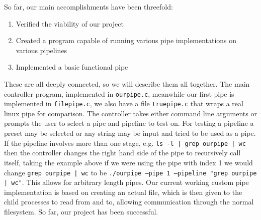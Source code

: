 So far, our main accomplishments have been threefold:
\begin{enumerate}
\item Verified the viability of our project
\item Created a program capable of running various pipe implementations on various pipelines
\item Implemented a basic functional pipe
\end{enumerate}
These are all deeply connected, so we will describe them all together. The main controller program, implemented in \texttt{ourpipe.c}, meanwhile our first pipe is implemented in \texttt{filepipe.c}, we also have a file \texttt{truepipe.c} that wraps a real linux pipe for comparison. The controller takes either command line arguments or prompts the user to select a pipe and pipeline to test on. For testing a pipeline a preset may be selected or any string may be input and tried to be used as a pipe. If the pipeline involves more than one stage, e.g. \texttt{ls -l | grep ourpipe | wc} then the controller changes the right hand side of the pipe to recursively call itself, taking the example above if we were using the pipe with index 1 we would change \texttt{grep ourpipe | wc} to be \texttt{./ourpipe --pipe 1 --pipeline "grep ourpipe | wc"}. This allows for arbitrary length pipes. Our current working custom pipe implementation is based on creating an actual file, which is then given to the child processes to read from and to, allowing communication through the normal filesystem. So far, our project has been successful.

